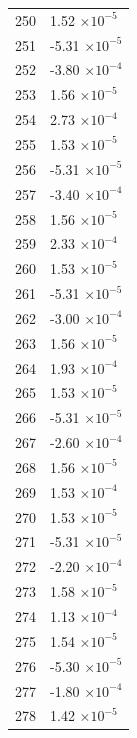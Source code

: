 \documentclass[a4paper,11pt]{article}
\begin{document}
\begin{center}
\begin{longtable}{|R{1.5cm}|R{2.5cm}|}
  250 &         1.52 $\times 10^{          -5}$ \\
  251 &        -5.31 $\times 10^{          -5}$ \\
  252 &        -3.80 $\times 10^{          -4}$ \\
  253 &         1.56 $\times 10^{          -5}$ \\
  254 &         2.73 $\times 10^{          -4}$ \\
  255 &         1.53 $\times 10^{          -5}$ \\
  256 &        -5.31 $\times 10^{          -5}$ \\
  257 &        -3.40 $\times 10^{          -4}$ \\
  258 &         1.56 $\times 10^{          -5}$ \\
  259 &         2.33 $\times 10^{          -4}$ \\
  260 &         1.53 $\times 10^{          -5}$ \\
  261 &        -5.31 $\times 10^{          -5}$ \\
  262 &        -3.00 $\times 10^{          -4}$ \\
  263 &         1.56 $\times 10^{          -5}$ \\
  264 &         1.93 $\times 10^{          -4}$ \\
  265 &         1.53 $\times 10^{          -5}$ \\
  266 &        -5.31 $\times 10^{          -5}$ \\
  267 &        -2.60 $\times 10^{          -4}$ \\
  268 &         1.56 $\times 10^{          -5}$ \\
  269 &         1.53 $\times 10^{          -4}$ \\
  270 &         1.53 $\times 10^{          -5}$ \\
  271 &        -5.31 $\times 10^{          -5}$ \\
  272 &        -2.20 $\times 10^{          -4}$ \\
  273 &         1.58 $\times 10^{          -5}$ \\
  274 &         1.13 $\times 10^{          -4}$ \\
  275 &         1.54 $\times 10^{          -5}$ \\
  276 &        -5.30 $\times 10^{          -5}$ \\
  277 &        -1.80 $\times 10^{          -4}$ \\
  278 &         1.42 $\times 10^{          -5}$ \\

\end{longtable}
\end{center}
\end{document}
